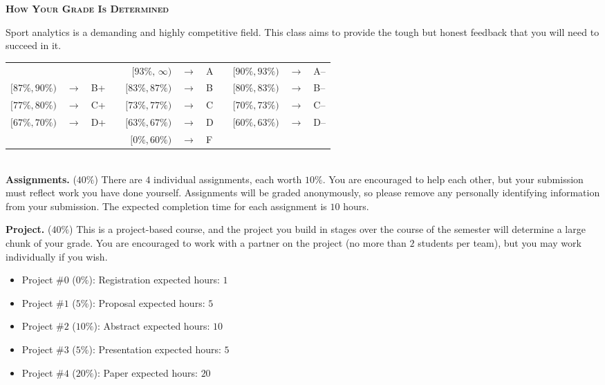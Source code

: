 \documentclass[11pt]{article}
\begin{document}
\newpage
\textbf{\textsc{How Your Grade Is Determined}}
\begin{adjustwidth}{1cm}{0cm}
	Sport analytics is a demanding and highly competitive field. This class aims to provide the tough but honest feedback that you will need to succeed in it.
  \begin{center}
    \begin{tabular}{rclcrclcrcl}
                      &               &     & & $[93\%,\,\infty)$ & $\rightarrow$ & A & & $[90\%, 93\%)$ & $\rightarrow$	& A--\\
      $[87\%, 90\%)$  & $\rightarrow$	& B+  & & $[83\%, 87\%)$  & $\rightarrow$ & B & & $[80\%, 83\%)$ & $\rightarrow$	& B--\\
      $[77\%, 80\%)$  & $\rightarrow$	& C+  & & $[73\%, 77\%)$  & $\rightarrow$ & C & & $[70\%, 73\%)$ & $\rightarrow$	& C--\\
      $[67\%, 70\%)$  & $\rightarrow$	& D+  & & $[63\%, 67\%)$  & $\rightarrow$ & D & & $[60\%, 63\%)$ & $\rightarrow$  & D--\\
                      &               &     & & $[ 0\%, 60\%)$  & $\rightarrow$ & F\\
    \end{tabular}
  \end{center}
  ~\\
	\textbf{Assignments.} ($40\%$) There are $4$ individual assignments, each worth $10\%$. You are encouraged to help each other, but your submission must reflect work you have done yourself. Assignments will be graded anonymously, so please remove any personally identifying information from your submission. The expected completion time for each assignment is $10$ hours.

  \textbf{Project.} ($40\%$) This is a project-based course, and the project you build in stages over the course of the semester will determine a large chunk of your grade. You are encouraged to work with a partner on the project (no more than $2$ students per team), but you may work individually if you wish.
  \begin{itemize}
    \item Project \#$0$ ($0\%$): Registration                   \hfill expected hours: $1$
    \item Project \#$1$ ($5\%$): Proposal                       \hfill expected hours: $5$
    \item Project \#$2$ ($10\%$): Abstract                      \hfill expected hours: $10$
    \item Project \#$3$ ($5\%$): Presentation                   \hfill expected hours: $5$
    \item Project \#$4$ ($20\%$): Paper                         \hfill expected hours: $20$
  \end{itemize}


\end{adjustwidth}
\end{document}

